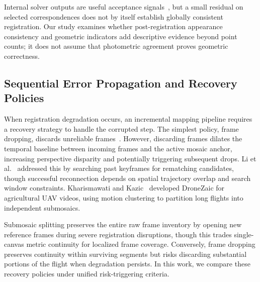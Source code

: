 Internal solver outputs are useful acceptance signals~\cite{hwang2026,li2023}, but a small residual on selected correspondences does not by itself establish globally consistent registration. Our study examines whether post-registration appearance consistency and geometric indicators add descriptive evidence beyond point counts; it does not assume that photometric agreement proves geometric correctness.

\subsection{Sequential Error Propagation and Recovery Policies}
When registration degradation occurs, an incremental mapping pipeline requires a recovery strategy to handle the corrupted step. The simplest policy, frame dropping, discards unreliable frames~\cite{hwang2026}. However, discarding frames dilates the temporal baseline between incoming frames and the active mosaic anchor, increasing perspective disparity and potentially triggering subsequent drops. Li et al.~\cite{li2023} addressed this by searching past keyframes for rematching candidates, though successful reconnection depends on spatial trajectory overlap and search window constraints. Kharismawati and Kazic~\cite{kharismawati2025} developed DroneZaic for agricultural UAV videos, using motion clustering to partition long flights into independent submosaics.

Submosaic splitting preserves the entire raw frame inventory by opening new reference frames during severe registration disruptions, though this trades single-canvas metric continuity for localized frame coverage. Conversely, frame dropping preserves continuity within surviving segments but risks discarding substantial portions of the flight when degradation persists. In this work, we compare these recovery policies under unified risk-triggering criteria.
